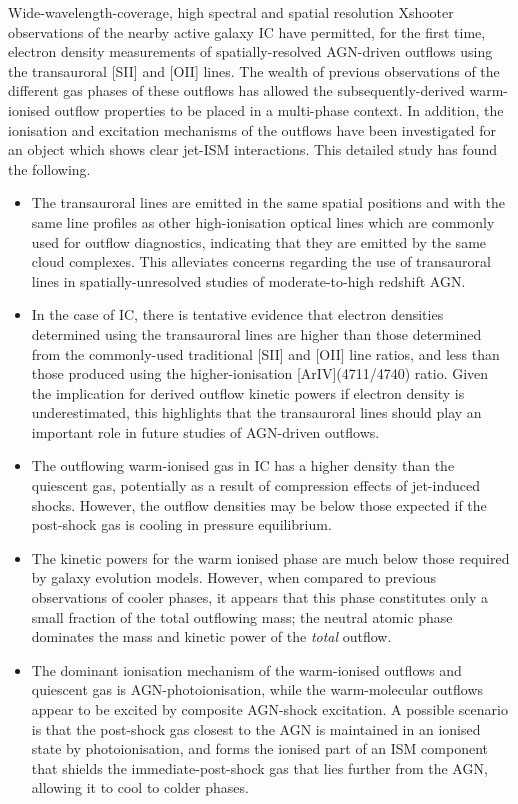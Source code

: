 Wide-wavelength-coverage, high spectral and spatial resolution Xshooter observations of the nearby active galaxy IC have permitted, for the first time, electron density measurements of spatially-resolved AGN-driven outflows using the transauroral [SII] and [OII] lines. The wealth of previous observations of the different gas phases of these outflows has allowed the subsequently-derived warm-ionised outflow properties to be placed in a multi-phase context. In addition, the ionisation and excitation mechanisms of the outflows have been investigated for an object which shows clear jet-ISM interactions. This detailed study has found the following.
\begin{itemize}
    \item The transauroral lines are emitted in the same spatial positions and with the same line profiles as other high-ionisation optical lines which are commonly used for outflow diagnostics, indicating that they are emitted by the same cloud complexes. This alleviates concerns regarding the use of transauroral lines in spatially-unresolved studies of moderate-to-high redshift AGN.
    \item In the case of IC, there is tentative evidence that electron densities determined using the transauroral lines are higher than those determined from the commonly-used traditional [SII] and [OII] line ratios, and less than those produced using the higher-ionisation [ArIV](4711/4740) ratio. Given the implication for derived outflow kinetic powers if electron density is underestimated, this highlights that the transauroral lines should play an important role in future studies of AGN-driven outflows.
    \item The outflowing warm-ionised gas in IC has a higher density than the quiescent gas, potentially as a result of compression effects of jet-induced shocks. However, the outflow densities may be below those expected if the post-shock gas is cooling in pressure equilibrium.
    \item The kinetic powers for the warm ionised phase are much below those required by galaxy evolution models. However, when compared to previous observations of cooler phases, it appears that this phase constitutes only a small fraction of the total outflowing mass; the neutral atomic phase dominates the mass and kinetic power of the \textit{total} outflow.
    \item The dominant ionisation mechanism of the warm-ionised outflows and quiescent gas is AGN-photoionisation, while the warm-molecular outflows appear to be excited by composite AGN-shock excitation. A possible scenario is that the post-shock gas closest to the AGN is maintained in an ionised state by photoionisation, and forms the ionised part of an ISM component that shields the immediate-post-shock gas that lies further from the AGN, allowing it to cool to colder phases.
\end{itemize}

